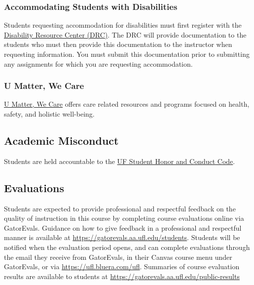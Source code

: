 \documentclass[11pt]{article}
\begin{document}
\subsubsection*{Accommodating Students with Disabilities}
Students requesting accommodation for disabilities must first register with the \href{https://disability.ufl.edu}{Disability Resource Center (DRC)}. The DRC will provide documentation to the students who must then provide this documentation to the instructor when requesting information. You must submit this documentation prior to submitting any assignments for which you are requesting accommodation. \vspace{2mm}

\subsubsection*{U Matter, We Care}
\href{https://umatter.ufl.edu}{U Matter, We Care} offers care related resources and programs focused on health, safety, and holistic well-being.

\subsection*{Academic Misconduct}
Students are held accountable to the \href{https://sccr.dso.ufl.edu/policies/student-honor-code-student-conduct-code}{UF Student Honor and Conduct Code}.

\subsection*{Evaluations}
Students are expected to provide professional and respectful feedback on the quality of instruction in this course by completing course evaluations online via GatorEvals. Guidance on how to give feedback in a professional and respectful manner is available at \url{https://gatorevals.aa.ufl.edu/students}. Students will be notified when the evaluation period opens, and can complete evaluations through the email they receive from GatorEvals, in their Canvas course menu under GatorEvals, or via \url{https://ufl.bluera.com/ufl}. Summaries of course evaluation results are available to students at \url{https://gatorevals.aa.ufl.edu/public-results}
\end{document}
